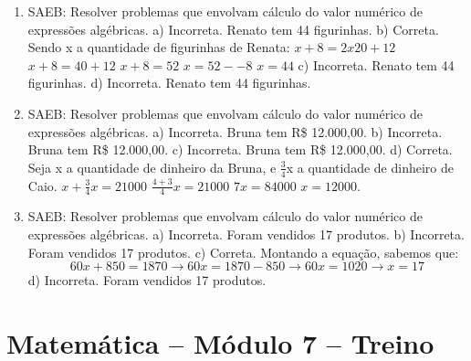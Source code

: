 \begin{enumerate}
\item
SAEB: Resolver problemas que envolvam cálculo do valor numérico de expressões algébricas.
a) Incorreta. Renato tem 44 figurinhas.
b) Correta. Sendo x a quantidade de figurinhas de Renata:
$x + 8 = 2 x 20 + 12$
$x + 8 = 40 + 12$
$x + 8 = 52$
$x = 52 -- 8$
$x = 44$
c) Incorreta. Renato tem 44 figurinhas.
d) Incorreta. Renato tem 44 figurinhas.

\item
SAEB: Resolver problemas que envolvam cálculo do valor numérico de
expressões algébricas. 
a) Incorreta. Bruna tem R\$ 12.000,00. 
b) Incorreta. Bruna tem R\$ 12.000,00.
c) Incorreta. Bruna tem R\$ 12.000,00.
d) Correta. Seja x a quantidade de dinheiro da Bruna, e $\frac{3}{4}$x a
quantidade de dinheiro de Caio.
$x + \frac{3}{4}x = 21000$
$\frac{4 + 3}{4}x = 21000$
$7x = 84000$
$x = 12000$.

\item
SAEB: Resolver problemas que envolvam cálculo do valor numérico de expressões algébricas.
a) Incorreta. Foram vendidos 17 produtos.
b) Incorreta. Foram vendidos 17 produtos.
c) Correta. Montando a equação, sabemos que:
\begin{displaymath} 60x + 850 = 1870 \rightarrow 60x = 1870 - 850 \rightarrow
60x = 1020 \rightarrow x = 17
\end{displaymath}
d) Incorreta. Foram vendidos 17 produtos.
\end{enumerate}

\section*{Matemática – Módulo 7 – Treino}

